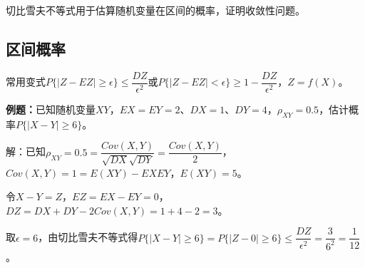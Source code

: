 \documentclass[UTF8, 12pt]{ctexart}
\begin{document}
切比雪夫不等式用于估算随机变量在区间的概率，证明收敛性问题。

\subsection{区间概率}

常用变式$P\{\vert Z-EZ\vert\geqslant\epsilon\}\leqslant\dfrac{DZ}{\epsilon^2}$或$P\{\vert Z-EZ\vert<\epsilon\}\geqslant1-\dfrac{DZ}{\epsilon^2}$，$Z=f(X)$。

\textbf{例题：}已知随机变量$XY$，$EX=EY=2$、$DX=1$、$DY=4$，$\rho_{XY}=0.5$，估计概率$P\{\vert X-Y\vert\geqslant6\}$。

解：已知$\rho_{XY}=0.5=\dfrac{Cov(X,Y)}{\sqrt{DX}\sqrt{DY}}=\dfrac{Cov(X,Y)}{2}$，$Cov(X,Y)=1=E(XY)-EXEY$，$E(XY)=5$。

令$X-Y=Z$，$EZ=EX-EY=0$，$DZ=DX+DY-2Cov(X,Y)=1+4-2=3$。

取$\epsilon=6$，由切比雪夫不等式得$P\{\vert X-Y\vert\geqslant6\}=P\{\vert Z-0\vert\geqslant6\}\leqslant\dfrac{DZ}{\epsilon^2}=\dfrac{3}{6^2}=\dfrac{1}{12}$。
\end{document}
